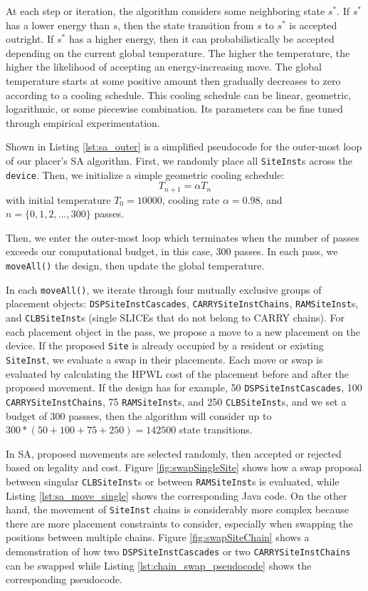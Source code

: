 At each step or iteration, the algorithm considers some neighboring state \(s^*\). 
If \(s^*\) has a lower energy than \(s\), then the state transition from \(s\) to \(s^*\) is accepted outright.
If \(s^*\) has a higher energy, then it can probabilistically be accepted depending on the current global temperature.
The higher the temperature, the higher the likelihood of accepting an energy-increasing move. 
The global temperature starts at some positive amount then gradually decreases to zero according to a cooling schedule.
This cooling schedule can be linear, geometric, logarithmic, or some piecewise combination. 
Its parameters can be fine tuned through empirical experimentation. 

Shown in Listing \ref{lst:sa_outer} is a simplified pseudocode for the outer-most loop of our placer's SA algorithm. 
First, we randomly place all \texttt{SiteInst}s across the \texttt{device}.
Then, we initialize a simple geometric cooling schedule: 
\begin{equation}
    \label{coolingSchedule}
    T_{n+1} = \alpha T_n
\end{equation}
with initial temperature \(T_0=10000\), cooling rate \(\alpha=0.98\), and \(n = \{0, 1, 2, ..., 300\}\) passes.


Then, we enter the outer-most loop which terminates when the number of passes exceeds our computational budget, in this case, 300 passes. 
In each pass, we \texttt{moveAll()} the design, then update the global temperature. 

In each \texttt{moveAll()}, we iterate through four mutually exclusive groups of placement objects: \texttt{DSPSiteInstCascades}, \texttt{CARRYSiteInstChains}, \texttt{RAMSiteInst}s, and \texttt{CLBSiteInst}s (single SLICEs that do not belong to CARRY chains).
For each placement object in the pass, we propose a move to a new placement on the device. 
If the proposed \texttt{Site} is already occupied by a resident or existing \texttt{SiteInst}, we evaluate a swap in their placements. 
Each move or swap is evaluated by calculating the HPWL cost of the placement before and after the proposed movement.
If the design has for example, 50 \texttt{DSPSiteInstCascades}, 100 \texttt{CARRYSiteInstChains}, 75 \texttt{RAMSiteInst}s, and 250 \texttt{CLBSiteInst}s, and we set a budget of 300 passses, then the algorithm will consider up to \(300 * (50 + 100 + 75 + 250) = 142500\) state transitions. 

In SA, proposed movements are selected randomly, then accepted or rejected based on legality and cost. 
Figure \ref{fig:swapSingleSite} shows how a swap proposal between singular \texttt{CLBSiteInst}s or between \texttt{RAMSiteInst}s is evaluated, while Listing \ref{lst:sa_move_single} shows the corresponding Java code.
On the other hand, the movement of \texttt{SiteInst} chains is considerably more complex because there are more placement constraints to consider, especially when swapping the positions between multiple chains.
Figure \ref{fig:swapSiteChain} shows a demonstration of how two \texttt{DSPSiteInstCascades} or two \texttt{CARRYSiteInstChains} can be swapped while Listing \ref{lst:chain_swap_pseudocode} shows the corresponding pseudocode. 


